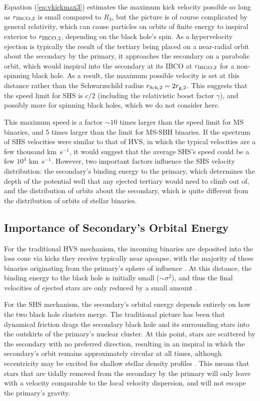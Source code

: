 \documentclass[a4paper,twocolumn]{emulateapj}
\begin{document}
{Equation (\ref{eq:vkickmax3}) estimates the maximum kick velocity possible so long as $r_{\rm IBCO,2}$ is small compared to $R_{3}$, but the picture is of course complicated by general relativity, which can cause particles on orbits of finite energy to inspiral exterior to $r_{\rm IBCO,2}$, depending on the black hole's spin. As a hypervelocity ejection is typically the result of the tertiary being placed on a near-radial orbit about the secondary by the primary, it approaches the secondary on a parabolic orbit, which would inspiral into the secondary at its IBCO at $r_{\rm IBGO,2}$ for a non-spinning black hole. As a result, the maximum possible velocity is set at this distance rather than the Schwarzschild radius $r_{\rm Sch,2} = 2 r_{\rm g,2}$. This suggests that the speed limit for SHS is $c/2$ (including the relativistic boost factor $\gamma$), and possibly more for spinning black holes, which we do not consider here.

This maximum speed is a factor $\sim 10$ times larger than the speed limit for MS binaries, and 5 times larger than the limit for MS-SBH binaries. If the spectrum of SHS velocities were similar to that of HVS, in which the typical velocities are a few thousand km~s$^{-1}$, it would suggest that the average SHS's speed could be a few $10^{4}$ km~s$^{-1}$. However, two important factors influence the SHS velocity distribution: the secondary's binding energy to the primary, which determines the depth of the potential well that any ejected tertiary would need to climb out of, and the distribution of orbits about the secondary, which is quite different from the distribution of orbits of stellar binaries.

\subsection{Importance of Secondary's Orbital Energy}\label{sec:orbenergy}
For the traditional HVS mechanism, the incoming binaries are deposited into the loss cone via kicks they receive typically near apoapse, with the majority of these binaries originating from the primary's sphere of influence \citep{Lightman:1977a}. At this distance, the binding energy to the black hole is initially small ($\sim \sigma^{2}$), and thus the final velocities of ejected stars are only reduced by a small amount \citep{Kobayashi:2012a}.

For the SHS mechanism, the secondary's orbital energy depends entirely on how the two black hole clusters merge. The traditional picture has been that dynamical friction drags the secondary black hole and its surrounding stars into the outskirts of the primary's nuclear cluster. At this point, stars are scattered by the secondary with no preferred direction, resulting in an inspiral in which the secondary's orbit remains approximately circular at all times, although eccentricity may be excited for shallow stellar density profiles \citep{Antonini:2012a}. This means that stars that are tidally removed from the secondary by the primary will only leave with a velocity comparable to the local velocity dispersion, and will not escape the primary's gravity.

}
\end{document}
